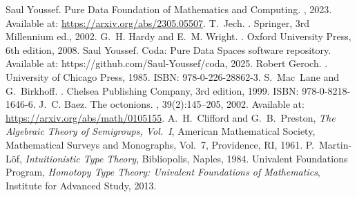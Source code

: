 \documentclass[11pt]{article}
\begin{document}
\begin{thebibliography}{2}

Saul Youssef.
\newblock Pure Data Foundation of Mathematics and Computing.
, 2023.
\newblock Available at: \url{https://arxiv.org/abs/2305.05507}.
T.~Jech.
.
\newblock Springer, 3rd Millennium ed., 2002.
G.~H. Hardy and E.~M. Wright.
.
\newblock Oxford University Press, 6th edition, 2008.
Saul Youssef.
\newblock Coda: Pure Data Spaces software repository.
\newblock Available at: https://github.com/Saul-Youssef/coda, 2025.
Robert Geroch.
.
\newblock University of Chicago Press, 1985.
\newblock ISBN: 978-0-226-28862-3.
S.~Mac~Lane and G.~Birkhoff.
.
\newblock Chelsea Publishing Company, 3rd edition, 1999.
\newblock ISBN: 978-0-8218-1646-6.
J.~C. Baez.
\newblock The octonions.
, 39(2):145--205, 2002.
\newblock Available at: \url{https://arxiv.org/abs/math/0105155}.
A.~H.~Clifford and G.~B.~Preston, 
\emph{The Algebraic Theory of Semigroups, Vol.~I}, 
American Mathematical Society, Mathematical Surveys and Monographs, Vol.~7, Providence, RI, 1961.
P.~Martin-L{\"o}f, 
\emph{Intuitionistic Type Theory}, 
Bibliopolis, Naples, 1984.
Univalent Foundations Program, 
\emph{Homotopy Type Theory: Univalent Foundations of Mathematics}, 
Institute for Advanced Study, 2013.
\end{thebibliography}
\end{document}
